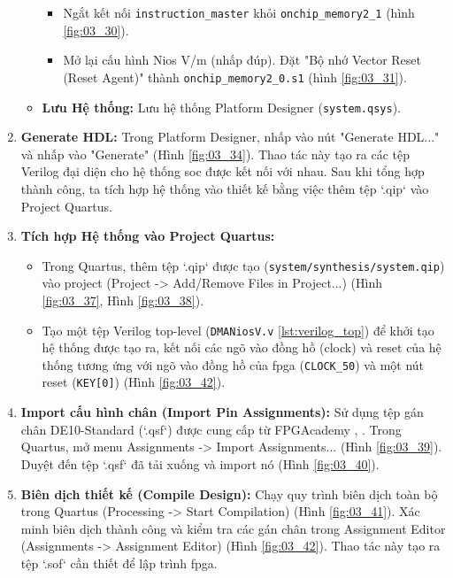 \begin{enumerate}
\begin{itemize}
        \begin{itemize}
            \item Ngắt kết nối \texttt{instruction\_master} khỏi \texttt{onchip\_memory2\_1} (hình \ref{fig:03_30}). 
            \item Mở lại cấu hình Nios V/m (nhấp đúp). Đặt "Bộ nhớ Vector Reset (Reset Agent)" thành \texttt{onchip\_memory2\_0.s1} (hình \ref{fig:03_31}).
        \end{itemize}
        \item \textbf{Lưu Hệ thống:} Lưu hệ thống Platform Designer (\texttt{system.qsys}).
    \end{itemize}
    \item \textbf{Generate HDL:} Trong Platform Designer, nhấp vào nút "Generate HDL..." và nhấp vào "Generate" (Hình \ref{fig:03_34}). Thao tác này tạo ra các tệp Verilog đại diện cho hệ thống \acrshort{soc} được kết nối với nhau. Sau khi tổng hợp thành công, ta tích hợp hệ thống vào thiết kế bằng việc thêm tệp `.qip` vào Project Quartus.
    \item \textbf{Tích hợp Hệ thống vào Project Quartus:}
    \begin{itemize}
        \item Trong Quartus, thêm tệp `.qip` được tạo (\texttt{system/synthesis/system.qip}) vào project (Project -> Add/Remove Files in Project...) (Hình \ref{fig:03_37}, Hình \ref{fig:03_38}).
        \item Tạo một tệp Verilog top-level (\texttt{DMANiosV.v} \ref{lst:verilog_top}) để khởi tạo hệ thống được tạo ra, kết nối các ngõ vào đồng hồ (clock) và reset của hệ thống tương ứng với ngõ vào đồng hồ của \acrshort{fpga} (\texttt{CLOCK\_50}) và một nút reset (\texttt{KEY[0]}) (Hình \ref{fig:03_42}). 
    \end{itemize}
    \item \textbf{Import cấu hình chân (Import Pin Assignments):} Sử dụng tệp gán chân DE10-Standard (`.qsf`) được cung cấp từ FPGAcademy \cite{fpgacademy-qsf}, \cite{fpgacademy-boards}. Trong Quartus, mở menu Assignments -> Import Assignments... (Hình \ref{fig:03_39}). Duyệt đến tệp `.qsf` đã tải xuống và import nó (Hình \ref{fig:03_40}).
    \item \textbf{Biên dịch thiết kế (Compile Design):} Chạy quy trình biên dịch toàn bộ trong Quartus (Processing -> Start Compilation) (Hình \ref{fig:03_41}). Xác minh biên dịch thành công và kiểm tra các gán chân trong Assignment Editor (Assignments -> Assignment Editor) (Hình \ref{fig:03_42}). Thao tác này tạo ra tệp `.sof` cần thiết để lập trình \acrshort{fpga}.
\end{enumerate}

